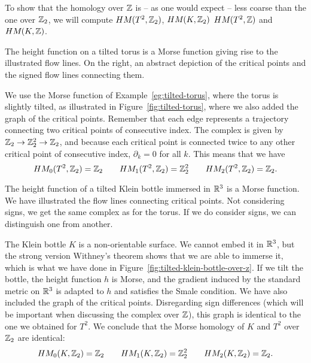     To show that the homology over $\Z$ is -- as one would expect -- less coarse than the one over $\Z_2$, we will compute $\HMf{T^2, \Z_2}$, $\HMf{K, \Z_2}$
    $\HMf{T^2, \Z}$ and $\HMf{K, \Z}$.



\begin{eg}
    \begin{marginfigure}
        \centering
        \caption{The height function on a tilted torus is a Morse function giving rise to the illustrated flow lines.
            On the right, an abstract depiction of the critical points and the signed flow lines connecting them.
        }

        \label{fig:tilted-torus}
    \end{marginfigure}
    We use the Morse function of Example~\ref{eg:tilted-torus}, where the torus is slightly tilted, as illustrated in Figure~\ref{fig:tilted-torus}, where we also added the graph of the critical points.
    Remember that each edge represents a trajectory connecting two critical points of consecutive index.
    The complex is given by $ \Z_2 \to  \Z_2^2 \to \Z_2$, and because each critical point is connected twice to any other critical point of consecutive index, $\partial_k = 0$ for all $k$. 
    This means that we have
    \[
        \HMf[0]{T^2, \Z_2} = \Z_2 \qquad
        \HMf[1]{T^2, \Z_2} = \Z_2^2 \qquad
        \HMf[2]{T^2, \Z_2} = \Z_2
    .\] 
\end{eg}
\begin{eg}
    \begin{marginfigure}
        \centering
        \caption{The height function of a tilted Klein bottle immersed in $\R^3$ is a Morse function.
            We have illustrated the flow lines connecting critical points.
            Not considering signs, we get the same complex as for the torus. If we do consider signs, we can distinguish one from another.
        }
        \label{fig:tilted-klein-bottle-over-z}
    \end{marginfigure}
    The Klein bottle $K$ is a non-orientable surface. We cannot embed it in $\R^3$, but the strong version Withney's theorem shows that we are able to immerse it, which is what we have done in Figure~\ref{fig:tilted-klein-bottle-over-z}.
    If we tilt the bottle, the height function $h$ is Morse, and the gradient induced by the standard metric on $\R^3$ is adapted to $h$ and satisfies the Smale condition.
    We have also included the graph of the critical points.
    Disregarding sign differences (which will be important when discussing the complex over $\Z$), this graph is identical to the one we obtained for $T^2$. We conclude that the Morse homology of $K$ and  $T^2$ over $\Z_2$ are identical:
    \[
        \HMf[0]{K, \Z_2} = \Z_2 \qquad
        \HMf[1]{K, \Z_2} = \Z_2^2 \qquad
        \HMf[2]{K, \Z_2} = \Z_2
    .\] 
\end{eg}


